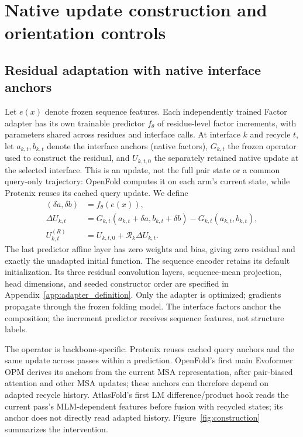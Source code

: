 \section{Native update construction and orientation controls}
\label{sec:construction}
\subsection{Residual adaptation with native interface anchors}
\label{sec:residual}
Let $e(x)$ denote frozen sequence features. Each independently trained Factor
adapter has its own trainable predictor $f_\theta$ of residue-level factor
increments, with parameters shared across residues and interface calls.
At interface $k$ and recycle $t$, let $a_{k,t},b_{k,t}$ denote the interface
anchors (native factors), $G_{k,t}$ the frozen operator used to construct
the residual, and $U_{k,t,0}$ the separately retained native update at the
selected interface.
This is an update, not the full pair state or a common query-only trajectory:
OpenFold computes it on each arm's current state, while Protenix reuses its
cached query update. We define
\begin{align}
 (\delta a,\delta b)&=f_\theta(e(x)),\label{eq:increments}\\
 \Delta U_{k,t}&=G_{k,t}(a_{k,t}+\delta a,b_{k,t}+\delta b)
               -G_{k,t}(a_{k,t},b_{k,t}),\label{eq:residual}\\
 U^{(R)}_{k,t}&=U_{k,t,0}+\mathcal R_k\Delta U_{k,t}.\label{eq:injection}
\end{align}
The last predictor affine layer has zero weights and bias, giving zero residual
and exactly the unadapted initial function. The sequence encoder retains its
default initialization. Its three residual convolution layers, sequence-mean
projection, head dimensions, and seeded constructor order are specified in
Appendix~\ref{app:adapter_definition}. Only the adapter is optimized;
gradients propagate through the frozen
folding model. The interface factors anchor the composition; the increment
predictor receives sequence features, not structure labels.

The operator is backbone-specific. Protenix reuses cached query anchors and
the same update across passes within a prediction. OpenFold's first main
Evoformer OPM derives its anchors from the current MSA representation, after
pair-biased attention and other MSA updates; these anchors can therefore
depend on adapted recycle history.
AtlasFold's first LM difference/product hook reads the current pass's
MLM-dependent features before fusion with recycled states; its anchor does
not directly read adapted history. Figure~\ref{fig:construction} summarizes
the intervention.

